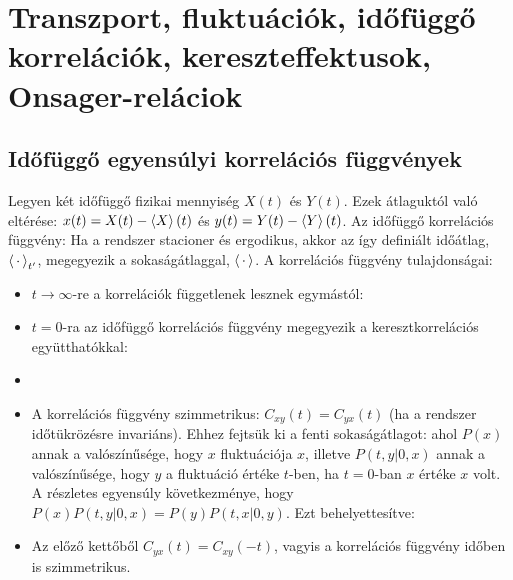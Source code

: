 \chapter{Transzport, fluktu\'aci\'ok, id\H{o}f\"ugg\H{o} korrel\'aci\'ok, kereszteffektusok, Onsager-rel\'aciok} 
 
 \section{Időfüggő egyensúlyi korrelációs függvények}
  
  Legyen két időfüggő fizikai mennyiség $X(t)$ és $Y(t)$. Ezek átlaguktól való eltérése: $x(t)=X(t)-\left\langle X\right\rangle(t)$ és $y(t)=Y(t)-\left\langle Y\right\rangle(t)$. Az időfüggő korrelációs függvény:
  Ha a rendszer stacioner és ergodikus, akkor az így definiált időátlag, $\left\langle\,\cdot\,\right\rangle_{t'}$, megegyezik a sokaságátlaggal, $\left\langle\,\cdot\,\right\rangle$. A korrelációs függvény tulajdonságai:
  \begin{itemize}
   \item 
    $t\to\infty$-re a korrelációk függetlenek lesznek egymástól:
    
   \item
    $t=0$-ra az időfüggő korrelációs függvény megegyezik a keresztkorrelációs együtthatókkal:
    
   \item 
   \item 
    A korrelációs függvény szimmetrikus: $C_{xy}(t)=C_{yx}(t)$ (ha a rendszer időtükrözésre invariáns). Ehhez fejtsük ki a fenti sokaságátlagot:
    ahol $P(x)$ annak a valószínűsége, hogy $x$ fluktuációja $x$, illetve $P(t,y|0,x) $ annak a valószínűsége, hogy $y$ a fluktuáció értéke $t$-ben, ha $t=0$-ban $x$ értéke $x$ volt. A részletes egyensúly következménye, hogy $P(x) P(t,y|0,x)=P(y) P(t,x|0,y)$. Ezt behelyettesítve:
   
   \item 
    Az előző kettőből $C_{yx}(t)=C_{xy}(-t)$, vagyis a korrelációs függvény időben is szimmetrikus. 
  \end{itemize}
  
